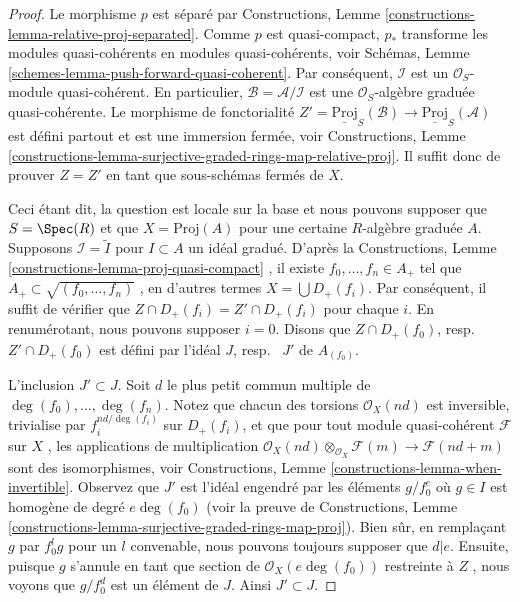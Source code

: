 \begin{proof}
Le morphisme  $p$  est séparé par Constructions, Lemme  \ref{constructions-lemma-relative-proj-separated}. Comme
 $p$  est quasi-compact,  $p_*$  transforme les modules
quasi-cohérents en modules quasi-cohérents, voir Schémas, Lemme  \ref{schemes-lemma-push-forward-quasi-coherent}. Par
conséquent,  $\mathcal{I}$  est un  $\mathcal{O}_S$-module quasi-cohérent. En
particulier,  $\mathcal{B} = \mathcal{A}/\mathcal{I}$  est une  $\mathcal{O}_S$-algèbre graduée quasi-cohérente. Le
morphisme de fonctorialité  $Z' = \underline{\text{Proj}}_S(\mathcal{B}) \to
\underline{\text{Proj}}_S(\mathcal{A})$  est défini partout et est une immersion
fermée, voir Constructions, Lemme  \ref{constructions-lemma-surjective-graded-rings-map-relative-proj}. Il suffit donc de prouver
 $Z = Z'$  en tant que sous-schémas fermés de  $X$.

\medskip\noindent
Ceci étant dit, la question est locale sur la base et nous pouvons supposer que
 $S = \Spec(R)$  et que  $X = \text{Proj}(A)$  pour une certaine  $R$-algèbre graduée
 $A$. Supposons  $\mathcal{I} = \widetilde{I}$  pour  $I \subset A$  un idéal gradué. D'après la
Constructions, Lemme  \ref{constructions-lemma-proj-quasi-compact} , il existe  $f_0, \ldots, f_n \in A_{+}$  tel que  $A_{+} \subset \sqrt{(f_0, \ldots, f_n)}$ , en
d'autres termes  $X = \bigcup D_{+}(f_i)$. Par conséquent, il suffit de vérifier que
 $Z \cap D_{+}(f_i) = Z' \cap D_{+}(f_i)$  pour chaque  $i$. En renumérotant, nous pouvons supposer
 $i = 0$. Disons que  $Z \cap D_{+}(f_0)$, resp. \ $Z' \cap D_{+}(f_0)$  est défini
par l'idéal  $J$, resp. \ $J'$  de  $A_{(f_0)}$.

\medskip\noindent
L'inclusion  $J' \subset J$. Soit  $d$  le plus petit commun multiple de
 $\deg(f_0), \ldots, \deg(f_n)$. Notez que chacun des torsions  $\mathcal{O}_X(nd)$  est inversible,
trivialise par  $f_i^{nd/\deg(f_i)}$  sur  $D_{+}(f_i)$, et que pour tout module
quasi-cohérent  $\mathcal{F}$  sur  $X$ , les applications de multiplication
 $\mathcal{O}_X(nd) \otimes_{\mathcal{O}_X} \mathcal{F}(m)
\to \mathcal{F}(nd + m)$  sont des isomorphismes, voir Constructions, Lemme  \ref{constructions-lemma-when-invertible}.
Observez que  $J'$  est l'idéal engendré par les éléments  $g/f_0^e$  où
 $g \in I$  est homogène de degré  $e\deg(f_0)$  (voir la preuve de Constructions,
Lemme  \ref{constructions-lemma-surjective-graded-rings-map-proj}). Bien sûr, en remplaçant  $g$  par  $f_0^lg$  pour un
 $l$  convenable, nous pouvons toujours supposer que  $d | e$. Ensuite,
puisque  $g$  s'annule en tant que section de  $\mathcal{O}_X(e\deg(f_0))$  restreinte à
 $Z$ , nous voyons que  $g/f_0^d$  est un élément de  $J$. Ainsi
 $J' \subset J$.


\end{proof}
